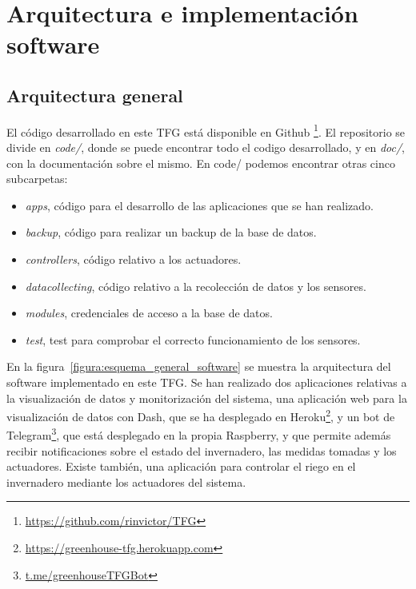 \documentclass[a4paper, 12pt, oneside]{book}
\begin{document}

	
\section{Arquitectura e implementación software}
\label{sec:Arquitectura e implementación software}

\subsection{Arquitectura general}
\label{subsec:arquitectura general}
El código desarrollado en este TFG está disponible en Github \footnote{\url{https://github.com/rinvictor/TFG}}. El repositorio se divide en \textit{code/}, donde se puede encontrar todo el codigo desarrollado, y en \textit{doc/}, con la documentación sobre el mismo.
En code/ podemos encontrar otras cinco subcarpetas:
\begin{itemize}
\item \textit{apps}, código para el desarrollo de las aplicaciones que se han realizado.
\item \textit{backup}, código para realizar un backup de la base de datos.
\item \textit{controllers}, código relativo a los actuadores.
\item \textit{datacollecting}, código relativo a la recolección de datos y los sensores.
\item \textit{modules}, credenciales de acceso a la base de datos.
\item \textit{test}, test para comprobar el correcto funcionamiento de los sensores.
\end{itemize}

En la figura~\ref{figura:esquema_general_software} se muestra la arquitectura del software implementado en este TFG. Se han realizado dos aplicaciones relativas a la visualización de datos y monitorización del sistema, una aplicación web para la visualización de datos con Dash, que se ha desplegado en Heroku\footnote{\url{https://greenhouse-tfg.herokuapp.com}}, y un bot de Telegram\footnote{\url{t.me/greenhouseTFGBot}}, que está desplegado en la propia Raspberry, y que permite además recibir notificaciones sobre el estado del invernadero, las medidas tomadas y los actuadores.
Existe también, una aplicación para controlar el riego en el invernadero mediante los actuadores del sistema.
\end{document}
